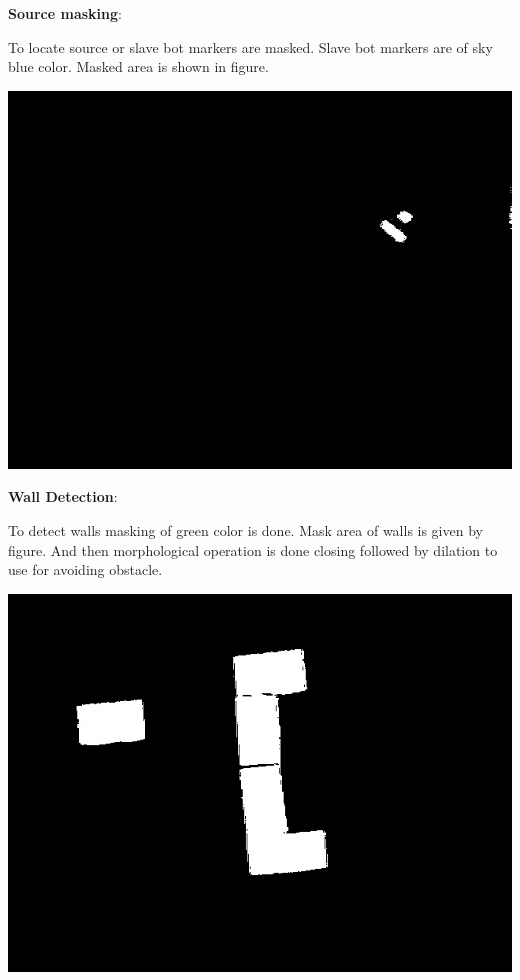 \documentclass[report]{res}
\begin{document}
	\pagebreak
	
	
	\textbf{Source masking}:
	
	To locate source or slave bot markers are masked. Slave bot markers are of sky blue color. Masked area is shown in figure.
	
	\begin{center}
		\includegraphics[scale =0.9]{graphics/case1/slave_mask.jpeg}\\
	\end{center}
	
	\pagebreak
	
	
	\textbf{Wall Detection}:
	
	To detect walls masking of green color is done. Mask area of walls is given by figure. And then morphological operation is done closing followed by dilation to use for avoiding obstacle.
	
	\begin{center}
		\includegraphics[scale = 0.7]{graphics/case1/walls_mask.jpeg}\\
	\end{center}
	
\end{document}
